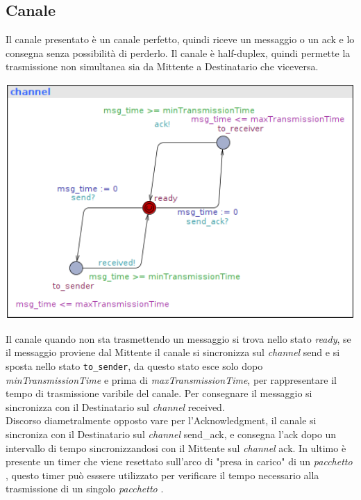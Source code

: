 \documentclass[a4paper]{article}
\newcommand{\channel}{\textit{channel }}
\newcommand{\pacchetto}{\textit{pacchetto }}
\begin{document}
\subsection{Canale}
Il canale presentato è un canale perfetto, quindi riceve un messaggio o un ack e lo consegna senza possibilità di perderlo.
Il canale è half-duplex, quindi permette la trasmissione non simultanea sia da Mittente a Destinatario che viceversa.\\
\begin{center}\includegraphics[width=1\textwidth]{channel_safe.png}\end{center}
Il canale quando non sta trasmettendo un messaggio si trova nello stato \textit{ready}, se il messaggio proviene dal Mittente il canale si sincronizza sul \channel send e si sposta nello stato \texttt{to\_sender}, da questo stato esce solo dopo \textit{minTransmissionTime} e prima di \textit{maxTransmissionTime}, per rappresentare il tempo di trasmissione varibile del canale.
Per consegnare il messaggio si sincronizza con il Destinatario sul \channel received.\\
Discorso diametralmente opposto vare per l'Acknowledgment, il canale si sincroniza con il Destinatario sul \channel send\_ack, e consegna l'ack dopo un intervallo di tempo sincronizzandosi con il Mittente sul \channel ack.
In ultimo è presente un timer che viene resettato sull'arco di "presa in carico" di un \pacchetto, questo timer può esssere utilizzato per verificare il tempo necessario alla trasmissione di un singolo \pacchetto.
\end{document}
